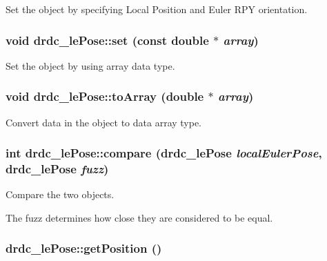 Set the object by specifying Local Position and Euler RPY orientation. 

\hypertarget{classdrdc__lePose_9e548bb34490b9d75f6bf8caaa4b0c6b}{
\subsubsection[set]{\setlength{\rightskip}{0pt plus 5cm}void drdc\_\-lePose::set (const double $\ast$ {\em array})}}
\label{classdrdc__lePose_9e548bb34490b9d75f6bf8caaa4b0c6b}


Set the object by using array data type. 

\hypertarget{classdrdc__lePose_71cf667ff3d208675f2cbc517f1c4345}{
\subsubsection[toArray]{\setlength{\rightskip}{0pt plus 5cm}void drdc\_\-lePose::toArray (double $\ast$ {\em array})}}
\label{classdrdc__lePose_71cf667ff3d208675f2cbc517f1c4345}


Convert data in the object to data array type. 

\hypertarget{classdrdc__lePose_961dc8435371eea28ebd6a4d9cb67269}{
\subsubsection[compare]{\setlength{\rightskip}{0pt plus 5cm}int drdc\_\-lePose::compare ({\bf drdc\_\-lePose} {\em localEulerPose}, \/  {\bf drdc\_\-lePose} {\em fuzz})}}
\label{classdrdc__lePose_961dc8435371eea28ebd6a4d9cb67269}


Compare the two objects. 

The fuzz determines how close they are considered to be equal. \hypertarget{classdrdc__lePose_1954d7b4ecfd2fcd17d72e9e2d56c067}{
\subsubsection[getPosition]{ drdc\_\-lePose::getPosition ()}}
\label{classdrdc__lePose_1954d7b4ecfd2fcd17d72e9e2d56c067}


